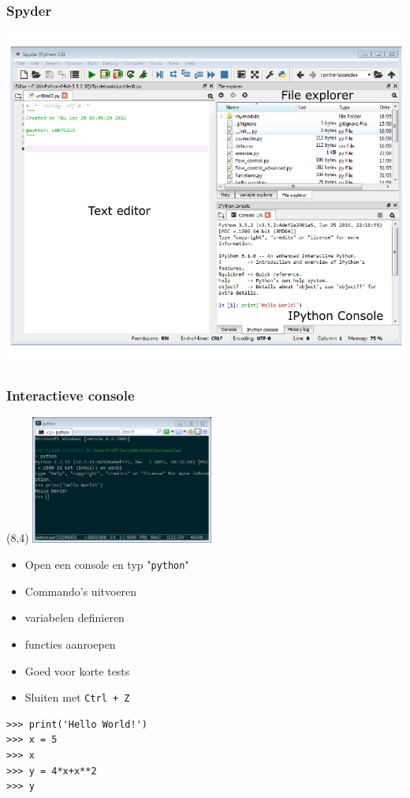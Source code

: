 \documentclass[t]{beamer}
\begin{document}
\begin{frame}
	\frametitle{Spyder}
	
    \vspace{-0.5cm}
	
    \center
    \includegraphics[height=\textheight]{fig/spyder}
    
\end{frame}
\begin{frame}[fragile]
	\frametitle{Interactieve console}
    \begin{textblock}{6}(8,4)
        \includegraphics[width=6cm]{fig/commandwindow}
    \end{textblock}
    	
    \begin{itemize}
    	\item Open een console en typ "\lstinline{python}"
		\item Commando's uitvoeren
		\item variabelen definieren
		\item functies aanroepen
		\item Goed voor korte tests
		\item Sluiten met \lstinline[language=bash]{Ctrl + Z}
	\end{itemize}
	
    \vspace{2cm}
    
	\begin{lstlisting}
>>> print('Hello World!')
>>> x = 5
>>> x
>>> y = 4*x+x**2
>>> y
	\end{lstlisting}
\end{frame}
\end{document}
